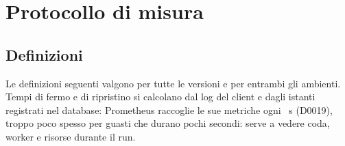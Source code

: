 \chapter{Protocollo di misura}
\label{cap:misura}

\section{Definizioni}
\label{sec:definizioni}

Le definizioni seguenti valgono per tutte le versioni e per entrambi gli ambienti. Tempi di fermo e di ripristino si calcolano dal log del client e dagli istanti registrati nel database: Prometheus raccoglie le sue metriche ogni ~s (D0019), troppo poco spesso per guasti che durano pochi secondi: serve a vedere coda, worker e risorse durante il run.

